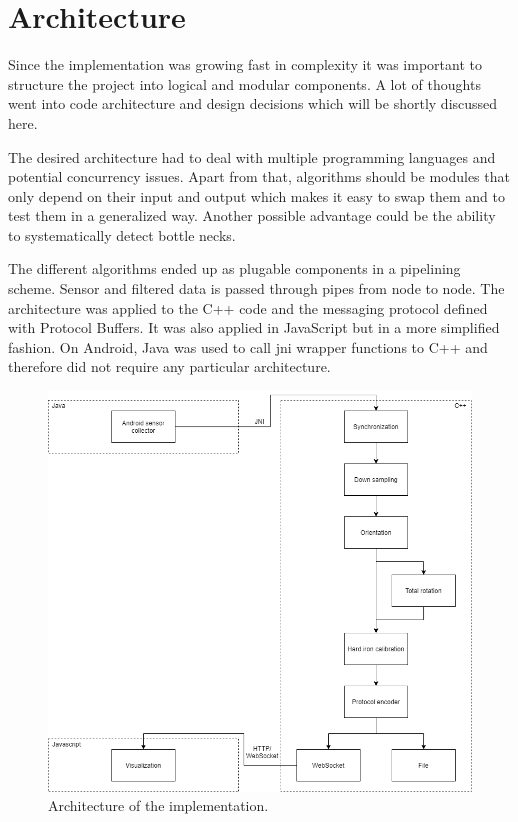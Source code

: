 \section{Architecture}

Since the implementation was growing fast in complexity it was important to structure the project into logical and modular components. A lot of thoughts went into code architecture and design decisions which will be shortly discussed here.

The desired architecture had to deal with multiple programming languages and potential concurrency issues. Apart from that, algorithms should be modules that only depend on their input and output which makes it easy to swap them and to test them in a generalized way. Another possible advantage could be the ability to systematically detect bottle necks.

The different algorithms ended up as plugable components in a pipelining scheme. Sensor and filtered data is passed through pipes from node to node. The architecture was applied to the C++ code and the messaging protocol defined with Protocol Buffers. It was also applied in JavaScript but in a more simplified fashion. On Android, Java was used to call \gls{jni} wrapper functions to C++ and therefore did not require any particular architecture.

\begin{figure}[hbt!]
    \centering
    \includegraphics[width=1.0\textwidth]{figures/architecture.png}
    \caption{Architecture of the implementation.}
    \label{fig:architecture}
\end{figure}


